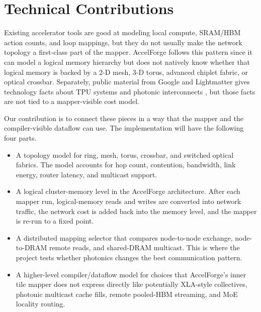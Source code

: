 \documentclass[conference,onecolumn]{IEEEtran}
\begin{document}
\section{Technical Contributions}

Existing accelerator tools are good at modeling local compute, SRAM/HBM action
counts, and loop mappings, but they do not usually make the network topology a
first-class part of the mapper. AccelForge follows this pattern since it can model a
logical memory hierarchy but does not natively know whether that logical
memory is backed by a 2-D mesh, 3-D torus, advanced chiplet fabric, or optical
crossbar. Separately, public material from Google and Lightmatter gives
technology facts about TPU systems and photonic interconnects
\cite{lightmatter-passage,lightmatter-m1000,tpu7x,hotchips-ironwood}, but those
facts are not tied to a mapper-visible cost model.

Our contribution is to connect these pieces in a way that the mapper and the
compiler-visible dataflow can use. The implementation will have the following four parts.
\begin{itemize}
    \item A topology model for ring, mesh, torus, crossbar, and switched
    optical fabrics. The model accounts for hop count, contention, bandwidth,
    link energy, router latency, and multicast support.
    \item A logical cluster-memory level in the AccelForge architecture. After
    each mapper run, logical-memory reads and writes are converted into network
    traffic, the network cost is added back into the memory level, and the
    mapper is re-run to a fixed point.
    \item A distributed mapping selector that compares node-to-node exchange,
    node-to-DRAM remote reads, and shared-DRAM multicast. This is where the
    project tests whether photonics changes the best communication pattern.
    \item A higher-level compiler/dataflow model for choices that AccelForge's
    inner tile mapper does not express directly like potentially XLA-style collectives,
    photonic multicast cache fills, remote pooled-HBM streaming, and MoE
    locality routing.
\end{itemize}
\end{document}

